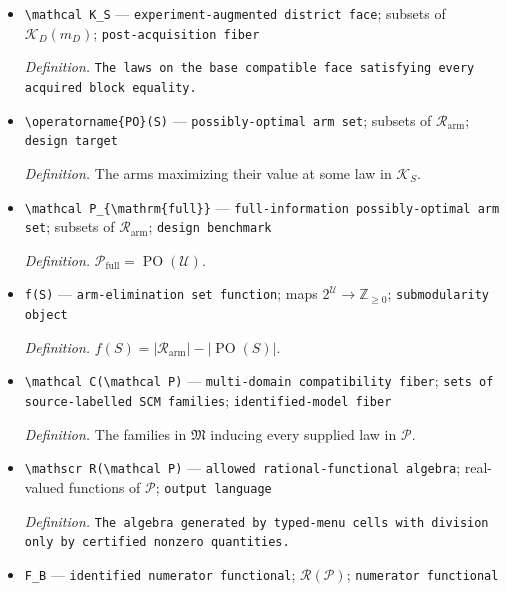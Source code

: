 \documentclass{article}
\begin{document}
\begin{itemize}
  \item \texttt{\textbackslash{}\allowbreak{}mathcal K\_\allowbreak{}S} --- \texttt{experiment-\allowbreak{}augmented district face}; subsets of \(\mathcal K_D(m_D)\); \texttt{post-\allowbreak{}acquisition fiber}
  \par\smallskip\noindent\emph{Definition.} \texttt{The laws on the base compatible face satisfying every acquired block equality.}
  \item \texttt{\textbackslash{}\allowbreak{}operatorname\{PO\}\allowbreak{}(S)} --- \texttt{possibly-\allowbreak{}optimal arm set}; subsets of \(\mathcal R_{\mathrm{arm}}\); \texttt{design target}
  \par\smallskip\noindent\emph{Definition.} The arms maximizing their value at some law in \(\mathcal K_S\).
  \item \texttt{\textbackslash{}\allowbreak{}mathcal P\_\allowbreak{}\{\textbackslash{}\allowbreak{}mathrm\{full\}\allowbreak{}\}\allowbreak{}} --- \texttt{full-\allowbreak{}information possibly-\allowbreak{}optimal arm set}; subsets of \(\mathcal R_{\mathrm{arm}}\); \texttt{design benchmark}
  \par\smallskip\noindent\emph{Definition.} \(\mathcal P_{\mathrm{full}}=\operatorname{PO}(\mathcal U)\).
  \item \texttt{f(S)} --- \texttt{arm-\allowbreak{}elimination set function}; maps \(2^{\mathcal U}\to\mathbb Z_{\ge0}\); \texttt{submodularity object}
  \par\smallskip\noindent\emph{Definition.} \(f(S)=\lvert\mathcal R_{\mathrm{arm}}\rvert-\lvert\operatorname{PO}(S)\rvert\).
  \item \texttt{\textbackslash{}\allowbreak{}mathcal C(\textbackslash{}\allowbreak{}mathcal P)} --- \texttt{multi-\allowbreak{}domain compatibility fiber}; \texttt{sets of source-\allowbreak{}labelled SCM families}; \texttt{identified-\allowbreak{}model fiber}
  \par\smallskip\noindent\emph{Definition.} The families in \(\mathfrak M\) inducing every supplied law in \(\mathcal P\).
  \item \texttt{\textbackslash{}\allowbreak{}mathscr R(\textbackslash{}\allowbreak{}mathcal P)} --- \texttt{allowed rational-\allowbreak{}functional algebra}; real-valued functions of \(\mathcal P\); \texttt{output language}
  \par\smallskip\noindent\emph{Definition.} \texttt{The algebra generated by typed-\allowbreak{}menu cells with division only by certified nonzero quantities.}
  \item \texttt{F\_\allowbreak{}B} --- \texttt{identified numerator functional}; \(\mathscr R(\mathcal P)\); \texttt{numerator functional}

\end{itemize}
\end{document}
